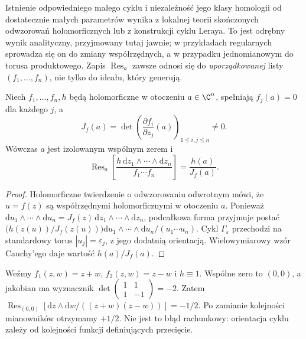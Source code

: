 \begin{uwaga}
Istnienie odpowiedniego małego cyklu i niezależność jego
klasy homologii od dostatecznie małych parametrów wynika
z lokalnej teorii skończonych odwzorowań holomorficznych
lub z konstrukcji cyklu Leraya. To jest odrębny wynik
analityczny, przyjmowany tutaj jawnie; w przykładach
regularnych sprowadza się on do zmiany współrzędnych,
a w przypadku jednomianowym do torusa produktowego.
Zapis $\operatorname{Res}_a$ zawsze odnosi się do \emph{uporządkowanej}
listy $(f_1,\ldots,f_n)$, nie tylko do ideału, który generują.
\end{uwaga}

\begin{twierdzenie}
\label{tw:ga4-jac-res}
Niech $f_1,\ldots,f_n,h$ będą holomorficzne w otoczeniu
$a\in\C^n$, spełniają $f_j(a)=0$ dla każdego $j$, a
\[
J_f(a)=\det\left(\frac{\partial f_i}{\partial z_j}(a)
\right)_{1\le i,j\le n}\ne0.
\]
Wówczas $a$ jest izolowanym wspólnym zerem i
\[
\operatorname{Res}_a\!\left[
\frac{h\,\mathrm dz_1\wedge\cdots\wedge\mathrm dz_n}
{f_1\cdots f_n}\right]=\frac{h(a)}{J_f(a)}.
\]
\end{twierdzenie}
\begin{proof}
Holomorficzne twierdzenie o odwzorowaniu odwrotnym
mówi, że $u=f(z)$ są współrzędnymi holomorficznymi
w otoczeniu $a$. Ponieważ
$\mathrm du_1\wedge\cdots\wedge\mathrm du_n
=J_f(z)\,\mathrm dz_1\wedge\cdots\wedge\mathrm dz_n$,
podcałkowa forma przyjmuje postać
$\bigl(h(z(u))/J_f(z(u))\bigr)\mathrm du_1\wedge\cdots
\wedge\mathrm du_n/(u_1\cdots u_n)$.
Cykl $\Gamma_\varepsilon$ przechodzi na standardowy torus
$|u_j|=\varepsilon_j$, z jego dodatnią orientacją.
Wielowymiarowy wzór Cauchy'ego daje wartość
$h(a)/J_f(a)$.
\end{proof}

\begin{przyklad}
Weźmy $f_1(z,w)=z+w$, $f_2(z,w)=z-w$ i $h\equiv1$.
Wspólne zero to $(0,0)$, a jakobian ma wyznacznik
$\det\begin{pmatrix}1&1\\1&-1\end{pmatrix}=-2$.
Zatem
$\operatorname{Res}_{(0,0)}[\mathrm dz\wedge\mathrm dw/
((z+w)(z-w))]=-1/2$.
Po zamianie kolejności mianowników otrzymamy $+1/2$.
Nie jest to błąd rachunkowy: orientacja cyklu zależy od
kolejności funkcji definiujących przecięcie.
\end{przyklad}

